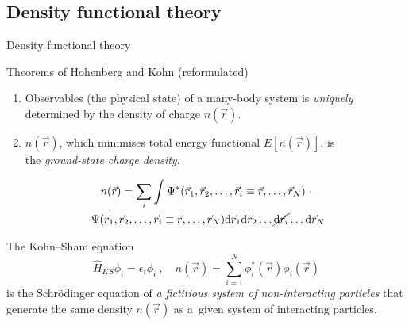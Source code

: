\documentclass[noamsthm,8pt,t,xcolor={dvipsnames}]{beamer}
\begin{document}
\subsection{Density functional theory}
\begin{frame}{Density functional theory}
   \vspace*{-3mm}
   \begin{block}{Theorems of Hohenberg and Kohn (reformulated)}
      \begin{enumerate}
         \item Observables (the physical state) of a many-body system is \emph{uniquely} determined by the density of charge $n(\vec{r})$.
         \item $n(\vec r)$, which minimises total energy functional $E[n(\vec r)]$, is\\ the \emph{ground-state charge density}.
      \end{enumerate}
   \end{block}

   \vspace*{-5mm}

   \begin{multline*}
      n(\vec r) =\sum_i \int \Psi^*(\vec r_1, \vec r_2, \ldots, \vec r_i\equiv \vec r, \ldots, \vec r_N)\ \cdot \\
      \cdot \Psi(\vec r_1, \vec r_2, \ldots, \vec r_i\equiv \vec r, \ldots, \vec r_N) \mathrm{d}\vec r_1\mathrm{d}\vec r_2\ldots\cancel{\mathrm{d}\vec r_i}\ldots\mathrm{d}\vec r_N
   \end{multline*}

   \vspace*{-1mm}
   \pause

   \begin{block}{The Kohn--Sham equation}
      $$\hat H_{KS}\phi_i=\epsilon_i\phi_i\ ,\quad n(\vec r) =\sum_{i=1}^N \phi_i^*(\vec r) \phi_i(\vec r)$$ is the
      Schr\"odinger equation of \emph{a fictitious system of non-interacting particles} that generate the same density $n(\vec r)$ as a~given system of interacting particles.
   \end{block}
\end{frame}
\end{document}
